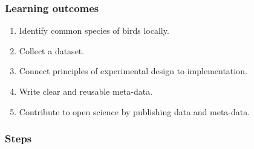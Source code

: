 \documentclass[
]{book}
\providecommand{\tightlist}{%
  \setlength{\itemsep}{0pt}\setlength{\parskip}{0pt}}
\begin{document}
\hypertarget{learning-outcomes}{%
\subsubsection*{Learning outcomes}\label{learning-outcomes}}

\begin{enumerate}
\def\labelenumi{\arabic{enumi}.}
\tightlist
\item
  Identify common species of birds locally.\\
\item
  Collect a dataset.\\
\item
  Connect principles of experimental design to implementation.\\
\item
  Write clear and reusable meta-data.\\
\item
  Contribute to open science by publishing data and meta-data.
\end{enumerate}

\hypertarget{steps}{%
\subsubsection*{Steps}\label{steps}}
\end{document}
